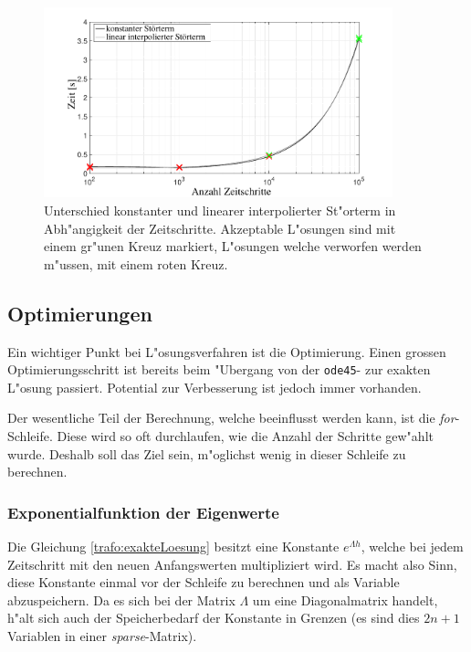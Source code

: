 \begin{refsection}
	
	\begin{figure}
			\centering
			\includegraphics[width=0.9\textwidth]{./Trafo/images/differenceTimestep.pdf}
			\caption{Unterschied konstanter und linearer interpolierter St"orterm in Abh"angigkeit der Zeitschritte. Akzeptable L"osungen sind mit einem gr"unen Kreuz markiert, L"osungen welche verworfen werden m"ussen, mit einem roten Kreuz.}
			\label{trafo:differenceTimestep}
	\end{figure}
		
\subsection{Optimierungen \label{trafo:SecOptimierung}}

Ein wichtiger Punkt bei L"osungsverfahren ist die Optimierung. Einen grossen Optimierungsschritt ist bereits beim "Ubergang von der \texttt{ode45}- zur exakten L"osung passiert. Potential zur Verbesserung ist jedoch immer vorhanden.

Der wesentliche Teil der Berechnung, welche beeinflusst werden kann, ist die \textit{for}-Schleife. Diese wird so oft durchlaufen, wie die Anzahl der Schritte gew"ahlt wurde. Deshalb soll das Ziel sein, m"oglichst wenig in dieser Schleife zu berechnen. 

\subsubsection{Exponentialfunktion der Eigenwerte}
Die Gleichung \ref{trafo:exakteLoesung} besitzt eine Konstante $e^{\Lambda h}$, welche bei jedem Zeitschritt mit den neuen Anfangswerten multipliziert wird. Es macht also Sinn, diese Konstante einmal vor der Schleife zu berechnen und als Variable abzuspeichern. Da es sich bei der Matrix $\Lambda$ um eine Diagonalmatrix handelt, h"alt sich auch der Speicherbedarf der Konstante in Grenzen (es sind dies $2n + 1$ Variablen in einer \textit{sparse}-Matrix). 


\end{refsection}
